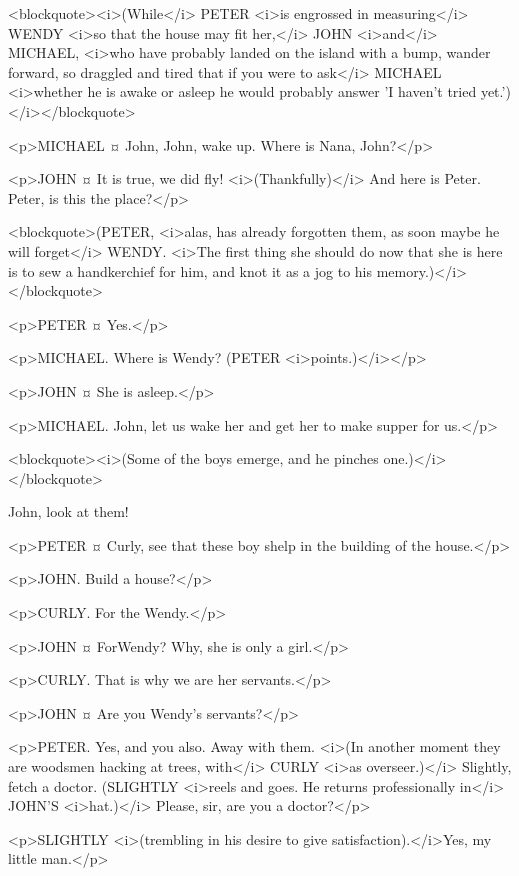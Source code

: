 <blockquote><i>(While</i> PETER <i>is engrossed in measuring</i> WENDY <i>so that the house may fit her,</i> JOHN <i>and</i> MICHAEL, <i>who have probably landed on the island with a bump, wander forward, so draggled and tired that if you were to ask</i> MICHAEL <i>whether he is awake or asleep he would probably answer 'I haven't tried yet.')</i></blockquote>

<p>MICHAEL ¤
John, John, wake up. Where is Nana, John?</p>

<p>JOHN ¤
It is true, we did fly! <i>(Thankfully)</i> And here is Peter. Peter, is this the place?</p>

<blockquote>(PETER, <i>alas, has already forgotten them, as soon maybe he will forget</i> WENDY. <i>The first thing she should do now that she is here is to sew a handkerchief for him, and knot it as a jog to his memory.)</i></blockquote>

<p>PETER ¤
Yes.</p>

<p>MICHAEL. Where is Wendy? (PETER <i>points.)</i></p>

<p>JOHN ¤
She is asleep.</p>

<p>MICHAEL. John, let us wake her and get her to make supper for us.</p>

<blockquote><i>(Some of the boys emerge, and he pinches one.)</i></blockquote>

John, look at them! 

<p>PETER ¤
Curly, see that these boy shelp in the building of the house.</p>

<p>JOHN. Build a house?</p>

<p>CURLY. For the Wendy.</p>

<p>JOHN ¤
ForWendy? Why, she is only a girl.</p>

<p>CURLY. That is why we are her servants.</p>

<p>JOHN ¤
Are you Wendy's servants?</p>

<p>PETER. Yes, and you also. Away with them. <i>(In another moment they are woodsmen hacking at trees, with</i> CURLY <i>as overseer.)</i> Slightly, fetch a doctor. (SLIGHTLY <i>reels and goes. He returns professionally in</i> JOHN'S <i>hat.)</i> Please, sir, are you a doctor?</p>

<p>SLIGHTLY <i>(trembling in his desire to give satisfaction).</i>Yes, my little man.</p>

